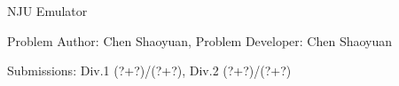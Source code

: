 \begin{Solution}{NJU Emulator}

\begin{frame}{\ProblemName}

\small Problem Author: Chen Shaoyuan, Problem Developer: Chen Shaoyuan \par \vspace{0.3cm}

\small Submissions: Div.1 (?+?)/(?+?), Div.2 (?+?)/(?+?)  \par \vspace{0.5cm}


\end{frame}

\end{Solution}
